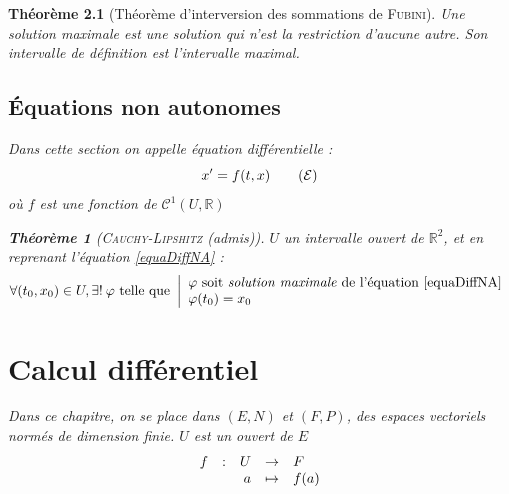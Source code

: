 \documentclass[11pt,a4paper]{report}
\newtheorem{theorem}{Théorème}[chapter]
\theoremstyle{definition}
\begin{document}
\begin{theorem}[Théorème d'interversion des sommations de \textsc{Fubini}]
{{Une \emph{solution maximale} est une solution qui n'est la restriction d'aucune autre. Son intervalle de définition est l'intervalle maximal.

\section{Équations non autonomes}
Dans cette section on appelle \emph{équation différentielle} : 
\begin{equation}\label{equaDiffNA}
x' = f(t,x)\tag{$\mathcal{E}$}
\end{equation}
où $f$ est une fonction de $\mathcal{C}^1(U,\ensuremath{\mathbb{R}})$
\begin{theorem}[\textsc{Cauchy-Lipshitz} (\textit{admis})]
$U$ un intervalle ouvert de $\ensuremath{\mathbb{R}}^2$, et en reprenant l'équation \eqref{equaDiffNA} : 
\[
    \forall (t_0,x_0) \in U, \exists ! \: \varphi \text{ telle que }
    \left|
    \begin{array}{l}
        \varphi \text{ soit \emph{solution maximale} de l'équation \eqref{equaDiffNA}}\\
        \varphi(t_0)=x_0
    \end{array}
    \right.
\]
\end{theorem}
%
%
\chapter{Calcul différentiel} %
\label{cha:calcul_differentiel}
Dans ce chapitre, on se place dans $\left( E, N \right)$ et $\left( F,P \right)$, des espaces vectoriels normés de dimension finie. $U$ est un ouvert de $E$
\[
    \begin{array}{r c r c l}
    f&:& U &\to & F \\
     & & a &\mapsto & f(a)
    \end{array}
\]
}}
\end{theorem}
\end{document}
